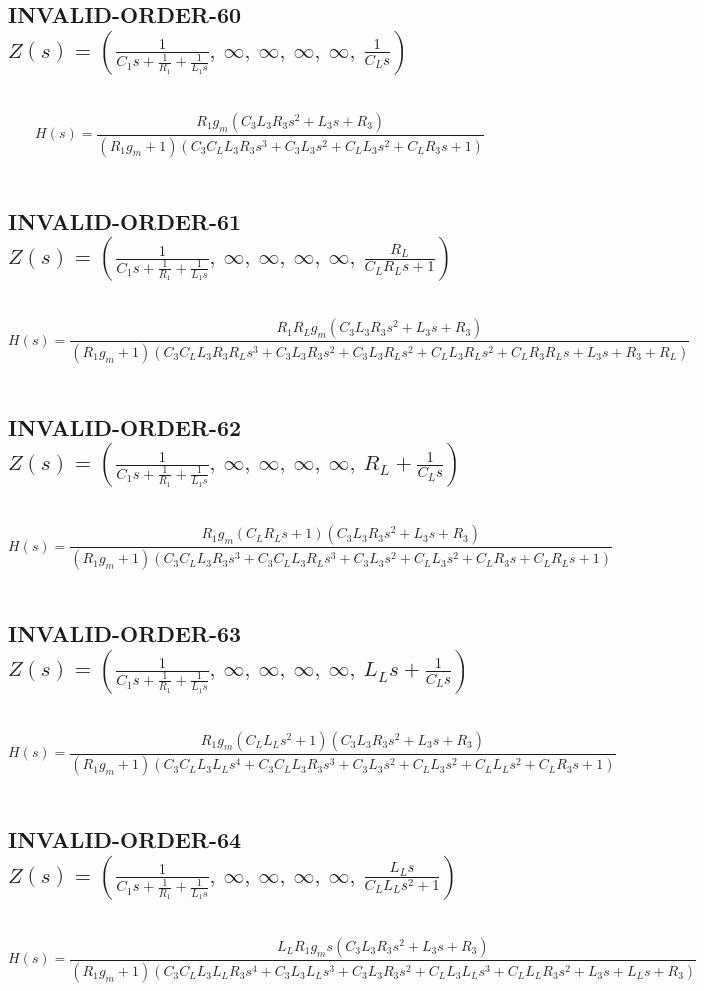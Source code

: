 \documentclass{article}
\begin{document}
\subsection{INVALID-ORDER-60 $Z(s) = \left( \frac{1}{C_{1} s + \frac{1}{R_{1}} + \frac{1}{L_{1} s}}, \  \infty, \  \infty, \  \infty, \  \infty, \  \frac{1}{C_{L} s}\right)$ } \ 
\textbf{\[H(s) = \frac{R_{1} g_{m} \left(C_{3} L_{3} R_{3} s^{2} + L_{3} s + R_{3}\right)}{\left(R_{1} g_{m} + 1\right) \left(C_{3} C_{L} L_{3} R_{3} s^{3} + C_{3} L_{3} s^{2} + C_{L} L_{3} s^{2} + C_{L} R_{3} s + 1\right)}\] } \ 
\subsection{INVALID-ORDER-61 $Z(s) = \left( \frac{1}{C_{1} s + \frac{1}{R_{1}} + \frac{1}{L_{1} s}}, \  \infty, \  \infty, \  \infty, \  \infty, \  \frac{R_{L}}{C_{L} R_{L} s + 1}\right)$ } \ 
\textbf{\[H(s) = \frac{R_{1} R_{L} g_{m} \left(C_{3} L_{3} R_{3} s^{2} + L_{3} s + R_{3}\right)}{\left(R_{1} g_{m} + 1\right) \left(C_{3} C_{L} L_{3} R_{3} R_{L} s^{3} + C_{3} L_{3} R_{3} s^{2} + C_{3} L_{3} R_{L} s^{2} + C_{L} L_{3} R_{L} s^{2} + C_{L} R_{3} R_{L} s + L_{3} s + R_{3} + R_{L}\right)}\] } \ 
\subsection{INVALID-ORDER-62 $Z(s) = \left( \frac{1}{C_{1} s + \frac{1}{R_{1}} + \frac{1}{L_{1} s}}, \  \infty, \  \infty, \  \infty, \  \infty, \  R_{L} + \frac{1}{C_{L} s}\right)$ } \ 
\textbf{\[H(s) = \frac{R_{1} g_{m} \left(C_{L} R_{L} s + 1\right) \left(C_{3} L_{3} R_{3} s^{2} + L_{3} s + R_{3}\right)}{\left(R_{1} g_{m} + 1\right) \left(C_{3} C_{L} L_{3} R_{3} s^{3} + C_{3} C_{L} L_{3} R_{L} s^{3} + C_{3} L_{3} s^{2} + C_{L} L_{3} s^{2} + C_{L} R_{3} s + C_{L} R_{L} s + 1\right)}\] } \ 
\subsection{INVALID-ORDER-63 $Z(s) = \left( \frac{1}{C_{1} s + \frac{1}{R_{1}} + \frac{1}{L_{1} s}}, \  \infty, \  \infty, \  \infty, \  \infty, \  L_{L} s + \frac{1}{C_{L} s}\right)$ } \ 
\textbf{\[H(s) = \frac{R_{1} g_{m} \left(C_{L} L_{L} s^{2} + 1\right) \left(C_{3} L_{3} R_{3} s^{2} + L_{3} s + R_{3}\right)}{\left(R_{1} g_{m} + 1\right) \left(C_{3} C_{L} L_{3} L_{L} s^{4} + C_{3} C_{L} L_{3} R_{3} s^{3} + C_{3} L_{3} s^{2} + C_{L} L_{3} s^{2} + C_{L} L_{L} s^{2} + C_{L} R_{3} s + 1\right)}\] } \ 
\subsection{INVALID-ORDER-64 $Z(s) = \left( \frac{1}{C_{1} s + \frac{1}{R_{1}} + \frac{1}{L_{1} s}}, \  \infty, \  \infty, \  \infty, \  \infty, \  \frac{L_{L} s}{C_{L} L_{L} s^{2} + 1}\right)$ } \ 
\textbf{\[H(s) = \frac{L_{L} R_{1} g_{m} s \left(C_{3} L_{3} R_{3} s^{2} + L_{3} s + R_{3}\right)}{\left(R_{1} g_{m} + 1\right) \left(C_{3} C_{L} L_{3} L_{L} R_{3} s^{4} + C_{3} L_{3} L_{L} s^{3} + C_{3} L_{3} R_{3} s^{2} + C_{L} L_{3} L_{L} s^{3} + C_{L} L_{L} R_{3} s^{2} + L_{3} s + L_{L} s + R_{3}\right)}\] } \ 
\end{document}
